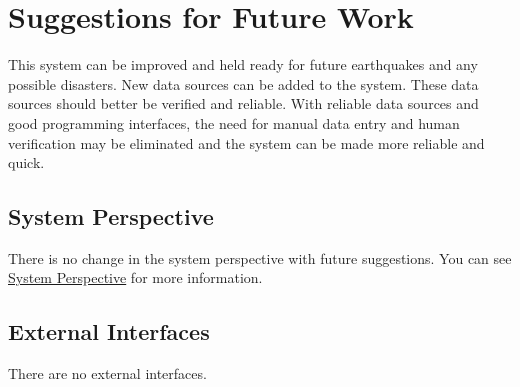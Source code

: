 \documentclass[a4paper]{article}
\begin{document}
    \section{Suggestions for Future Work}


    This system can be improved and held ready for future earthquakes and any possible disasters.
    New data sources can be added to the system. These data sources should better be verified and reliable. With reliable data sources and good programming interfaces, the need for manual data entry and human verification may be eliminated and
    the system can be made more reliable and quick.
    
        \subsection{System Perspective}
    
        There is no change in the system perspective with future suggestions.  
        You can see \hyperlink{subsection.1.3}{System Perspective} for more information.

        \subsection{External Interfaces}
        There are no external interfaces.
        
\end{document}
